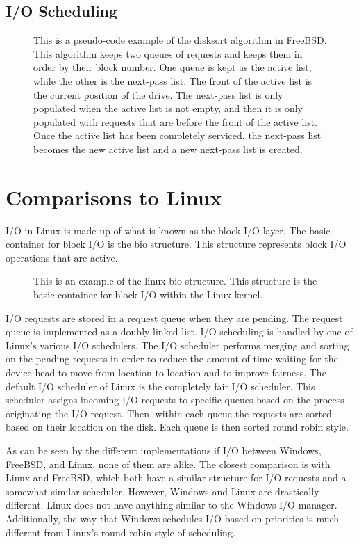 \documentclass[journal,letterpaper,draftclsnofoot,onecolumn,10pt]{IEEEtran}
\begin{document}
\subsection{I/O Scheduling}

\begin{figure}[H]
   
   \caption{This is a pseudo-code example of the disksort algorithm in FreeBSD. This algorithm keeps two queues of requests and keeps them in order by their block number. One queue is kept as the active list, while the other is the next-pass list. The front of the active list is the current position of the drive. The next-pass list is only populated when the active list is not empty, and then it is only populated with requests that are before the front of the active list. Once the active list has been completely serviced, the next-pass list becomes the new active list and a new next-pass list is created.}
\end{figure}

\section{Comparisons to Linux}

I/O in Linux is made up of what is known as the block I/O layer. The basic container for block I/O is the bio structure. This structure represents block I/O operations that are active.

\begin{figure}[H]
   
   \caption{This is an example of the linux bio structure. This structure is the basic container for block I/O within the Linux kernel.}
\end{figure}

I/O requests are stored in a request queue when they are pending. The request queue is implemented as a doubly linked list. I/O scheduling is handled by one of Linux's various I/O schedulers. The I/O scheduler performs merging and sorting on the pending requests in order to reduce the amount of time waiting for the device head to move from location to location and to improve fairness. The default I/O scheduler of Linux is the completely fair I/O scheduler. This scheduler assigns incoming I/O requests to specific queues based on the process originating the I/O request. Then, within each queue the requests are sorted based on their location on the disk. Each queue is then sorted round robin style.\cite{l05}

As can be seen by the different implementations if I/O between Windows, FreeBSD, and Linux, none of them are alike. The closest comparison is with Linux and FreeBSD, which both have a similar structure for I/O requests and a somewhat similar scheduler. However, Windows and Linux are drastically different. Linux does not have anything similar to the Windows I/O manager. Additionally, the way that Windows schedules I/O based on priorities is much different from Linux's round robin style of scheduling.
\end{document}

